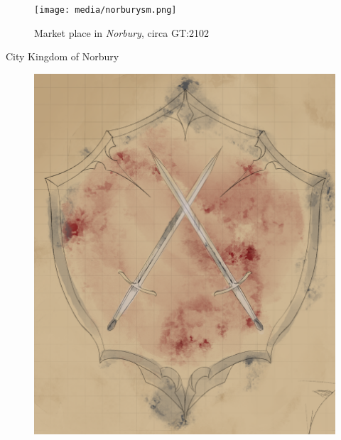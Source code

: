 \begin{figure}[ht!]
  \centering
  \vspace{-2.6cm}
  \centerline{
    \texttt{[image: media/norburysm.png]}
  }
  \par
  Market place in \emph{Norbury}, circa GT:2102
\end{figure}

\begin{infobox}{City Kingdom of Norbury}
  \begin{minipage}{0.30\linewidth}
    \begin{subfigure}[b]{\linewidth}
      \includegraphics[width=\textwidth]{media/norbury-bannersm.png}
    \end{subfigure}
  \end{minipage}\hfill
  \begin{minipage}{0.68\linewidth}
    \begin{itemize}[label={},noitemsep]

\end{itemize}
\end{minipage}
\end{infobox}
